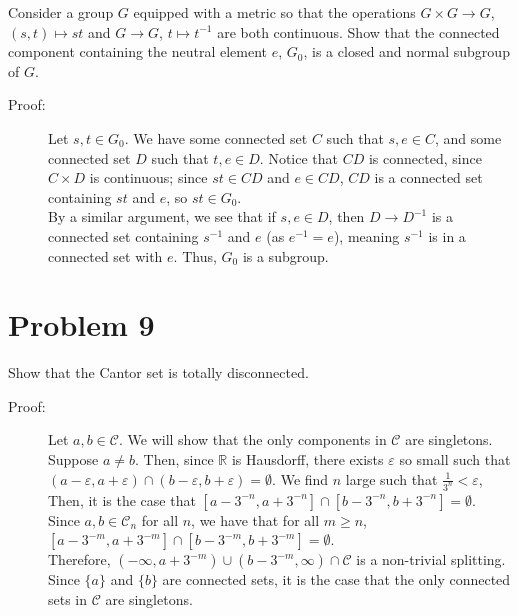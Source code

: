 \documentclass[8pt]{extarticle}
\newcommand{\R}{\mathbb{R}}
\begin{document}
  Consider a group $G$ equipped with a metric so that the operations $G\times G \rightarrow G$, $(s,t)\mapsto st$ and $G\rightarrow G$, $t\mapsto t^{-1}$ are both continuous. Show that the connected component containing the neutral element $e$, $G_0$, is a closed and normal subgroup of $G$.
  \begin{description}
    \item[Proof:] Let $s,t\in G_0$. We have some connected set $C$ such that $s,e\in C$, and some connected set $D$ such that $t,e\in D$. Notice that $CD$ is connected, since $C\times D$ is continuous; since $st\in CD$ and $e\in CD$, $CD$ is a connected set containing $st$ and $e$, so $st\in G_0$.\\

      By a similar argument, we see that if $s,e\in D$, then $D\rightarrow D^{-1}$ is a connected set containing $s^{-1}$ and $e$ (as $e^{-1} = e$), meaning $s^{-1}$ is in a connected set with $e$. Thus, $G_0$ is a subgroup.
  \end{description}
  \section{Problem 9}%
  Show that the Cantor set is totally disconnected.
  \begin{description}
    \item[Proof:] Let $a,b\in \mathcal{C}$. We will show that the only components in $\mathcal{C}$ are singletons.\\

      Suppose $a\neq b$. Then, since $\R$ is Hausdorff, there exists $\varepsilon$ so small such that $(a-\varepsilon,a+\varepsilon) \cap (b-\varepsilon,b+\varepsilon) = \emptyset$. We find $n$ large such that $\frac{1}{3^n} < \varepsilon$, Then, it is the case that $[a-3^{-n},a+3^{-n}] \cap [b-3^{-n},b+3^{-n}] = \emptyset$.\\

      Since $a,b\in \mathcal{C}_n$ for all $n$, we have that for all $m\geq n$, $[a-3^{-m},a+3^{-m}] \cap [b-3^{-m},b+3^{-m}] = \emptyset$.\\

      Therefore, $(-\infty,a+3^{-m}) \cup (b-3^{-m},\infty)\cap \mathcal{C}$ is a non-trivial splitting.\\

      Since $\{a\}$ and $\{b\}$ are connected sets, it is the case that the only connected sets in $\mathcal{C}$ are singletons.
  \end{description}
\end{document}
